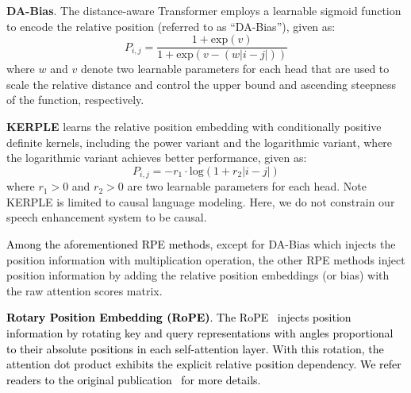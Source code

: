 \documentclass[journal]{IEEEtran}
\begin{document}
\textbf{DA-Bias}. The distance-aware Transformer \cite{DA} employs a learnable sigmoid function to encode the relative position (referred to as ``DA-Bias''), given as:
\begin{equation}\label{dabias}
    P_{i,j} = \frac{1+\text{exp}(v)}{1+\text{exp}(v-(w|i-j|))}
\end{equation}
where $w$ and $v$ denote two learnable parameters for each head that are used to scale the relative distance and control the upper bound and ascending steepness of the function, respectively. 

\textbf{KERPLE} \cite{kerple} learns the relative position embedding with conditionally positive definite kernels, including the power variant and the logarithmic variant, where the logarithmic variant achieves better performance, given as:
\begin{equation}\label{kerple}
    P_{i,j} = -r_{1}\cdot \text{log}(1+r_{2}|i-j|)
\end{equation}
where $r_{1}>0$ and $r_{2}>0$ are two learnable parameters for each head. Note KERPLE is limited to causal language modeling. Here, we do not constrain our speech enhancement system to be causal.

\textcolor{black}{Among the aforementioned RPE methods}, except for DA-Bias which injects the position information with multiplication operation, the other RPE methods inject position information by adding the relative position embeddings (or bias) with the raw attention scores matrix.

\textcolor{black}{\textbf{Rotary Position Embedding (RoPE)}. The RoPE~\cite{RoPE} injects position information by rotating key and query representations with angles proportional to their absolute positions in each self-attention layer. With this rotation, the attention dot product exhibits the explicit relative position dependency. We refer readers to the original publication~\cite{RoPE} for more details.}

\end{document}
